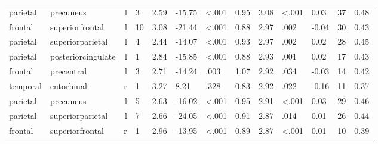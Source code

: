 \documentclass{article}
\begin{document}
\begin{longtable}{llrR{1.3cm}R{1cm}R{1.3cm}R{1cm}R{1cm}R{1.3cm}R{1cm}R{1.8cm}R{1.3cm}R{1.8cm}}
  parietal &                 precuneus &    l &         3 &                  2.59 &           -15.75 &      \textless.001 &                               0.95 &                          3.08 &                   \textless.001 &   0.03 &     37 &      0.48 \\
   frontal &           superiorfrontal &    l &        10 &                  3.08 &           -21.44 &      \textless.001 &                               0.88 &                          2.97 &                            .002 &  -0.04 &     30 &      0.43 \\
  parietal &          superiorparietal &    l &         4 &                  2.44 &           -14.07 &      \textless.001 &                               0.93 &                          2.97 &                            .002 &   0.02 &     28 &      0.45 \\
  parietal &        posteriorcingulate &    l &         1 &                  2.84 &           -15.85 &      \textless.001 &                               0.88 &                          2.93 &                            .001 &   0.02 &     17 &      0.43 \\
   frontal &                precentral &    l &         3 &                  2.71 &           -14.24 &               .003 &                               1.07 &                          2.92 &                            .034 &  -0.03 &     14 &      0.42 \\
  temporal &                entorhinal &    r &         1 &                  3.27 &             8.21 &               .328 &                               0.83 &                          2.92 &                            .022 &  -0.16 &     11 &      0.37 \\
  parietal &                 precuneus &    l &         5 &                  2.63 &           -16.02 &      \textless.001 &                               0.95 &                          2.91 &                   \textless.001 &   0.03 &     29 &      0.46 \\
  parietal &          superiorparietal &    l &         7 &                  2.66 &           -24.05 &      \textless.001 &                               0.91 &                          2.87 &                            .014 &   0.01 &     26 &      0.44 \\
   frontal &           superiorfrontal &    r &         1 &                  2.96 &           -13.95 &      \textless.001 &                               0.89 &                          2.87 &                   \textless.001 &   0.01 &     10 &      0.39 \\

\end{longtable}
\end{document}
